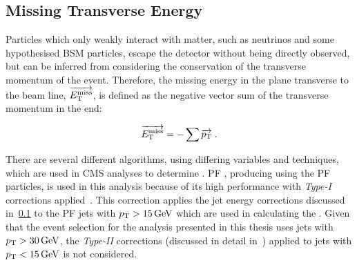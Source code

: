 \subsection{Missing Transverse Energy}
Particles which only weakly interact with matter, such as neutrinos and some hypothesised BSM particles, escape the detector without being directly observed, but can be inferred from considering the conservation of the transverse momentum of the event.
Therefore, the missing energy in the plane transverse to the beam line, $\overrightarrow{E_{\mathrm{T}}^{\text{miss}}}$, is defined as the negative vector sum of the transverse momentum in the end:

\begin{equation}
\overrightarrow{E_{\mathrm{T}}^{\text{miss}}} = - \sum \overrightarrow{p_{\mathrm{T}}} \;.
\label{eq:MET}
\end{equation}

There are several different algorithms, using differing variables and techniques, which are used in CMS analyses to determine \MET.
PF \MET, producing using the PF particles, is used in this analysis because of its high performance with \emph{Type-I} \MET corrections applied~\cite{CMS:2016ljj}.
This correction applies the jet energy corrections discussed in~\ref{} to the PF jets with $p_{\mathrm{T}} >15\,\text{Ge\hspace{-.08em}V}$ which are used in calculating the \MET.
Given that the event selection for the analysis presented in this thesis uses jets with $p_{\mathrm{T}} > 30\,\text{Ge\hspace{-.08em}V}$, the \emph{Type-II} corrections (discussed in detail in~\cite{Chatrchyan:2011tn}) applied to jets with $p_{\mathrm{T}} < 15\,\text{Ge\hspace{-.08em}V}$ is not considered.
